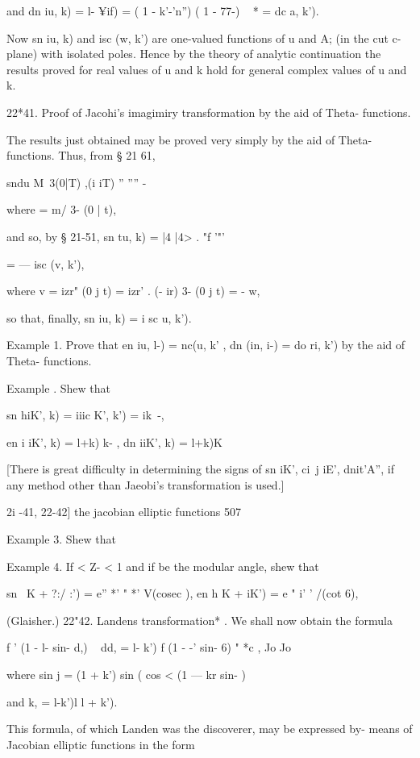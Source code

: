 and dn iu, k) = l- ¥if) = ( 1 - k'-'n'') ( 1 - 77-) ~ * = dc a, k').

Now sn iu, k) and isc (w, k') are one-valued functions of u and A; (in
the cut c-plane) with isolated poles. Hence by the theory of analytic
continuation the results proved for real values of u and k hold for
general complex values of u and k.

22*41. Proof of Jacohi's imagimiry transformation by the aid of Theta-
functions.

The results just obtained may be proved very simply by the aid of
Theta-functions. Thus, from § 21 61,

sndu M\ 3(0|T) ,(i iT) '' '''' -%

where = m/ 3- (0 | t),

and so, by § 21-51, sn tu, k) = |4 |4> . "f '"'

= — isc (v, k'),

where v = izr" (0 j t) = izr' . (- ir) 3- (0 j t) = - w,

so that, finally, sn iu, k) = i sc u, k').

Example 1. Prove that en iu, l-) = nc(u, k' , dn (in, i-) = do ri, k')
by the aid of Theta- functions.

Example . Shew that

sn hiK', k) = iiic K', k') = ik~-,

en i iK', k) = l+k) k- , dn iiK', k) = l+k)K

[There is great difficulty in determining the signs of sn iK', ci\ j
iE', dnit'A'', if any method other than Jaeobi's transformation is
used.]

2i -41, 22-42] the jacobian elliptic functions 507

Example 3. Shew that

Example 4. If < Z- < 1 and if be the modular angle, shew that

sn \ K + ?:/ :') = e'' *' " *' V(cosec ), en h K + iK') = e " i' '
/(cot 6),

(Glaisher.) 22"42. Landens transformation* . We shall now obtain the
formula

f ' (1 - l- sin- d,) ~ dd, = l- k') f (1 - -' sin- 6) " *c , Jo Jo

where sin j = (1 + k') sin ( cos < (1 — kr sin- ) ~

and k, = l-k')l l + k').

This formula, of which Landen was the discoverer, may be expressed by-
means of Jacobian elliptic functions in the form

